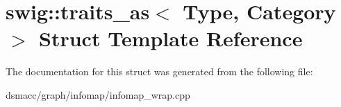 \hypertarget{structswig_1_1traits__as}{}\section{swig\+:\+:traits\+\_\+as$<$ Type, Category $>$ Struct Template Reference}
\label{structswig_1_1traits__as}


The documentation for this struct was generated from the following file\+:\begin{DoxyCompactItemize}
\item 
dsmacc/graph/infomap/infomap\+\_\+wrap.\+cpp\end{DoxyCompactItemize}
